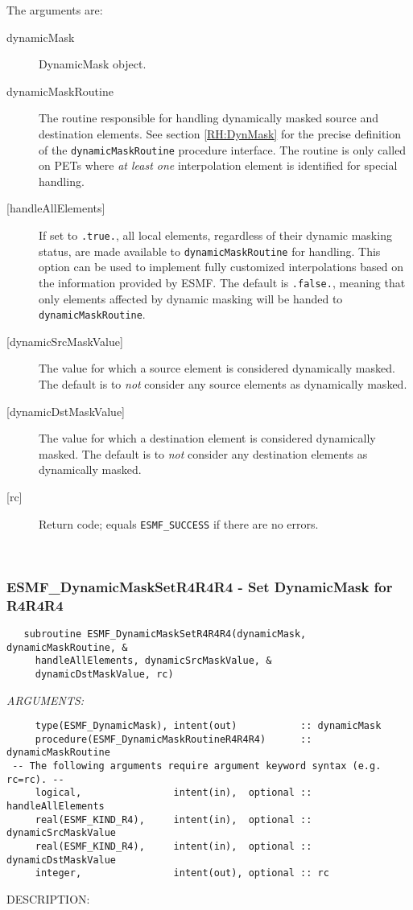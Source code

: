      The arguments are:
     \begin{description}
     \item[dynamicMask] 
       DynamicMask object.
     \item [dynamicMaskRoutine]
       The routine responsible for handling dynamically masked source and 
       destination elements. See section \ref{RH:DynMask} for the precise
       definition of the {\tt dynamicMaskRoutine} procedure interface.
       The routine is only called on PETs where {\em at least one} interpolation 
       element is identified for special handling.
     \item [{[handleAllElements]}]
       If set to {\tt .true.}, all local elements, regardless of their dynamic
       masking status, are made available to {\tt dynamicMaskRoutine} for
       handling. This option can be used to implement fully customized
       interpolations based on the information provided by ESMF.
       The default is {\tt .false.}, meaning that only elements affected by
       dynamic masking will be handed to {\tt dynamicMaskRoutine}.
     \item [{[dynamicSrcMaskValue]}]
       The value for which a source element is considered dynamically
       masked.
       The default is to {\em not} consider any source elements as
       dynamically masked.
     \item [{[dynamicDstMaskValue]}]
       The value for which a destination element is considered dynamically
       masked.
       The default is to {\em not} consider any destination elements as
       dynamically masked.
     \item[{[rc]}] 
       Return code; equals {\tt ESMF\_SUCCESS} if there are no errors.
     \end{description}
   
 
\mbox{}\hrulefill\ 
 
\subsubsection [ESMF\_DynamicMaskSetR4R4R4] {ESMF\_DynamicMaskSetR4R4R4 - Set DynamicMask for R4R4R4}


\begin{verbatim}   subroutine ESMF_DynamicMaskSetR4R4R4(dynamicMask, dynamicMaskRoutine, &
     handleAllElements, dynamicSrcMaskValue, &
     dynamicDstMaskValue, rc)\end{verbatim}{\em ARGUMENTS:}
\begin{verbatim}     type(ESMF_DynamicMask), intent(out)           :: dynamicMask
     procedure(ESMF_DynamicMaskRoutineR4R4R4)      :: dynamicMaskRoutine
 -- The following arguments require argument keyword syntax (e.g. rc=rc). --
     logical,                intent(in),  optional :: handleAllElements
     real(ESMF_KIND_R4),     intent(in),  optional :: dynamicSrcMaskValue
     real(ESMF_KIND_R4),     intent(in),  optional :: dynamicDstMaskValue
     integer,                intent(out), optional :: rc
           \end{verbatim}
{\sf DESCRIPTION:\\ }


